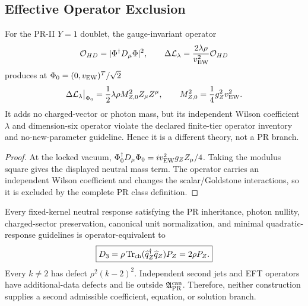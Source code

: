 \subsection{Effective Operator Exclusion}

\begin{proposition}
\label{prop:pr35-z-local-counteroperator}
For the PR-II $Y=1$ doublet, the gauge-invariant operator
\begin{equation}
 \mathcal O_{HD}
 =|\Phi^\dagger D_\mu\Phi|^2,
 \qquad
 \Delta\mathcal L_\lambda
 =\frac{2\lambda\rho}{v_{\rm EW}^2}\mathcal O_{HD}
 \label{eq:pr35-z-local-counteroperator}
\end{equation}
produces at $\Phi_0=(0,v_{\rm EW})^T/\sqrt2$
\begin{equation}
 \Delta\mathcal L_\lambda\big|_{\Phi_0}
 =\frac12\lambda\rho M_{Z,0}^2Z_\mu Z^\mu,
 \qquad M_{Z,0}^2=\frac14g_Z^2v_{\rm EW}^2.
\end{equation}
It adds no charged-vector or photon mass, but its independent Wilson \cite{Wilson_1975}
coefficient $\lambda$ and dimension-six operator violate the declared finite-tier operator inventory and no-new-parameter guideline.  Hence it is a different theory, not a PR branch.
\end{proposition}

\begin{proof}
At the locked vacuum,
$\Phi_0^\dagger D_\mu\Phi_0
=iv_{\rm EW}^2g_ZZ_\mu/4$.  Taking the modulus square gives the displayed neutral mass term.  The operator carries an independent Wilson coefficient and changes the scalar/Goldstone interactions, so it is excluded by the complete PR class definition.
\end{proof}

\begin{proposition}
Every fixed-kernel neutral response satisfying the PR inheritance, photon nullity, charged-sector preservation, canonical unit normalization, and minimal quadratic-response guidelines is operator-equivalent to \begin{equation}
 \boxed{D_3=\rho\operatorname{Tr}_{\rm ch}
 (\widehat q_Z^\dagger\widehat q_Z)P_Z=2\rho P_Z.}
\end{equation}
Every $k\ne2$ has defect $\rho^2(k-2)^2$.  Independent second jets and EFT operators have additional-data defects and lie outside $\mathfrak A_{\rm PR}^{\rm can}$.  Therefore, neither construction supplies a second admissible coefficient, equation, or solution branch.
\end{proposition}
